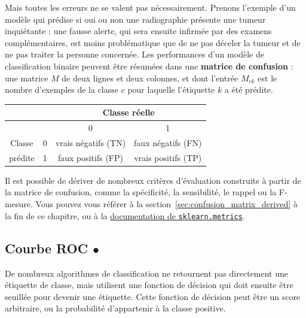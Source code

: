 Mais toutes les erreurs ne se valent pas nécessairement. Prenons l'exemple d'un
modèle qui prédise si oui ou non une radiographie présente une tumeur
inquiétante : une fausse alerte, qui sera ensuite infirmée par des examens
complémentaires, est moins problématique que de ne pas déceler la tumeur et de
ne pas traiter la personne concernée.  Les performances d'un modèle de
classification binaire peuvent être résumées dans une
\textbf{matrice de confusion} : une matrice $M$ de deux lignes et deux
colonnes, et dont l'entrée $M_{ck}$ est le nombre d'exemples de la classe $c$
pour laquelle l'étiquette $k$ a été prédite.
\begin{center}
  \begin{tabular}[h]{|c|c|c|c|} \hline \multicolumn{2}{|c}{} &
      \multicolumn{2}{|c|}{Classe réelle} \\ \hline \multicolumn{2}{|c|}{} & 0 & 1 \\ \hline 
    Classe & 0 & vrais négatifs (TN) & faux négatifs (FN)
    \\ \cline{2-4} prédite & 1 & faux positifs (FP) & vrais positifs (TP)
    \\ \hline
  \end{tabular}
\end{center}


Il est possible de dériver de nombreux critères d'évaluation construits à
partir de la matrice de confusion, comme la spécificité, la sensibilité, le
rappel ou la F-mesure. Vous pouvez vous référer à la
section~\ref{sec:confusion_matrix_derived} à la fin de ce chapitre, ou à la
\href{https://scikit-learn.org/stable/modules/model_evaluation.html#classification-metrics}{documentation
  de \texttt{sklearn.metrics}}.



\subsection{Courbe ROC $\bullet$}
De nombreux algorithmes de classification ne retournent pas directement une
étiquette de classe, mais utilisent une fonction de décision qui doit ensuite
être seuillée pour devenir une étiquette. Cette fonction de décision peut être
un score arbitraire, ou la probabilité d'appartenir à la classe positive.
  
